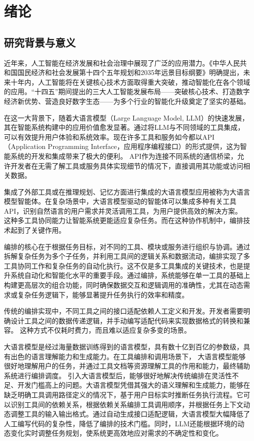 
\chapter{绪论}

\section{研究背景与意义}


近年来，人工智能在经济发展和社会治理中展现了广泛的应用潜力。《中华人民共和国国民经济和社会发展第十四个五年规划和2035年远景目标纲要》明确提出，未来十年内，人工智能将在关键核心技术方面取得重大突破，推动智能化在各个领域的应用。“十四五”期间提出的三大人工智能发展布局——突破核心技术、打造数字经济新优势、营造良好数字生态——为多个行业的智能化升级奠定了坚实的基础。

在这一大背景下，随着大语言模型（Large Language Model, LLM）的快速发展，其在智能系统构建中的应用价值愈发显著。通过将LLM与不同领域的工具集成，可以有效提升用户体验和系统效率。现在许多工具和服务如今都以API（Application Programming Interface，应用程序编程接口）的形式提供，这为智能系统的开发和集成带来了极大的便利。
API作为连接不同系统的通信桥梁，允许开发者在无需了解工具或服务具体实现细节的情况下，直接调用其功能或访问相关数据。

集成了外部工具或在推理规划、记忆方面进行集成的大语言模型应用被称为大语言模型智能体。在复杂场景中，大语言模型驱动的智能体可以集成多种有关工具API，识别自然语言的用户需求并灵活调用工具，为用户提供高效的解决方案。
这种多工具协同能力让智能系统更能适应复杂任务。而在这种协作机制中，编排技术起到了关键作用。

编排的核心在于根据任务目标，对不同的工具、模块或服务进行组织与协调。通过拆解复杂任务为多个子任务，并利用工具间的逻辑关系和数据流动，编排实现了多工具协同工作和复杂任务的自动化执行。这不仅是多工具集成的关键技术，也是提升系统自动化和智能化水平的重要手段。通过编排，系统能够在单一工具的基础上构建更高层次的组合功能，同时确保数据交互和逻辑调用的准确性，尤其在动态需求或复杂任务逻辑下，能够显著提升任务执行的效率和精度。

传统的编排实现中，不同工具之间的接口适配依赖人工定义和开发。开发者需要明确设计工具之间的数据传递逻辑，并手动编写适配代码来实现数据格式的转换和兼容。
这种方式不仅耗时费力，而且难以适应复杂多变的场景。

大语言模型是经过海量数据训练得到的语言模型，具有数十亿到百亿的参数级，具有出色的语言理解能力和生成能力。在工具编排和调用场景下，
大语言模型能够很好地理解用户的任务，并通过工具文档等资源理解工具的作用和能力，最终辅助系统进行编排调度。
引入大语言模型后，能够很好地解决传统编排在灵活性不足、开发门槛高上的问题。大语言模型凭借其强大的语义理解和生成能力，能够在缺乏明确工具调用路径定义的情况下，基于用户目标实时推断任务执行流程。它可以识别工具间的依赖关系，根据依赖关系编排工具调用顺序，并根据任务上下文动态调整工具的输入输出格式。通过自动生成接口适配逻辑，大语言模型大幅降低了人工编写代码的复杂性，降低了编排的技术门槛。同时，LLM还能根据环境的动态变化实时调整任务规划，使系统更高效地应对需求的不确定性和变化。

